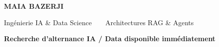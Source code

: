 {\fontsize{23}{26}\selectfont\bfseries\color{darknavy}MAIA BAZERJI}\par\vspace{4pt}%
{\fontsize{10}{12}\selectfont\color{accent}Ing\'enierie IA \& Data Science~~\textbar~~Architectures RAG \& Agents}\par\vspace{2pt}%
{\fontsize{8.5}{10}\selectfont\bfseries\color{graytext}Recherche d'alternance IA / Data \textemdash{} disponible imm\'ediatement}%

\vspace{6pt}
